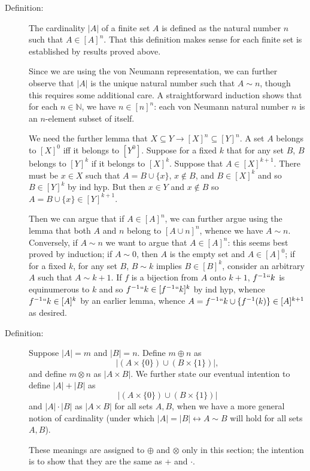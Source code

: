 \documentclass[12pt]{book}
\begin{document}
\begin{description}

\item[Definition:]  The cardinality $|A|$ of a finite set $A$ is defined as the natural number $n$ such that $A \in [A]^n$.  That this definition makes sense for each finite set is established by results proved above.


 Since we are using the von Neumann representation, we can further observe that $|A|$ is the unique natural number such that $A \sim n$, though this requires some additional care.
A straightforward induction shows that for each $n \in \mathbb N$, we have $n \in [n]^n$:  each von Neumann natural number $n$ is an $n$-element subset of itself. 

 We need the further lemma that $X \subseteq Y \rightarrow [X]^n \subseteq [Y]^n$.  A set $A$ belongs to $[X]^0$ iff it belongs to $[Y^0]$.  Suppose for a fixed $k$ that
for any set $B$, $B$ belongs to $[Y]^k$ if it belongs to $[X]^k$.   Suppose that $A \in [X]^{k+1}$.  There must be $x \in X$ such that $A = B \cup \{x\}$, $x \not\in B$, and $B \in [X]^k$
and so $B \in [Y]^k$ by ind hyp.  But then $x \in Y$ and $x \not\in B$ so $A = B \cup \{x\} \in [Y]^{k+1}$.

  Then we can argue that if $A \in [A]^n$, we can further argue using the lemma that both $A$ and $n$ belong to $[A \cup n]^n$, whence we have $A \sim n$.  Conversely, if $A \sim n$ we want to argue that $A \in [A]^n$:   this seems best proved by induction;  if $A \sim 0$, then $A$ is the empty set and $A \in [A]^0$;  if for a fixed $k$, for any set $B$, $B \sim k$ implies $B \in [B]^k$, consider an arbitrary $A$ such that $A \sim k+1$.  If $f$ is a bijection from $A$ onto $k+1$,
$f^{-1}``k$ is equinumerous to $k$ and so $f^{-1}``k \in [f^{-1}``k]^k$ by ind hyp, whence $f^{-1}``k \in [A]^k$ by an earlier lemma, whence $A= f^{-1}``k \cup \{f^{-1}(k)\} \in [A]^{k+1}$ as desired.

\item[Definition:]  Suppose $|A|=m$ and $|B|=n$.  Define $m\oplus n$ as $$|(A \times \{0\}) \cup (B \times \{1\})|,$$ and define $m \otimes n$ as $|A \times B|$.  We further state our eventual intention to define $|A|+|B|$ as $$|(A \times \{0\}) \cup (B \times \{1\})|$$ and $|A|\cdot |B|$ as $|A \times B|$ for all sets $A,B$, when we have a more general notion of cardinality (under which $|A|=|B| \leftrightarrow A \sim B$ will hold for all sets $A, B$).

These meanings are assigned to $\oplus$ and $\otimes$ only in this section;  the intention is to show that they are the same as + and $\cdot$.

\end{description}
\end{document}
